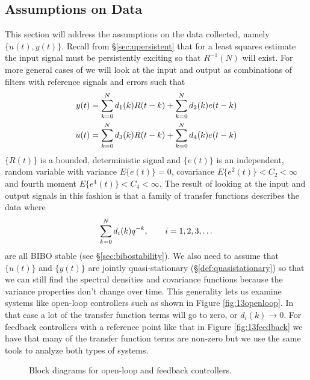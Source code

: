 \subsection{Assumptions on Data}
\label{sec:14data}
This section will address the assumptions on the data collected, namely $\{u(t),y(t)\}$. Recall from \S\ref{sec:upersistent} that for a least squares estimate the input signal must be persistently exciting so that $R^{-1}(N)$ will exist. For more general cases of we will look at the input and output as combinations of filters with reference signals and errors such that
\begin{align*}
y(t) &= \sum_{k=0}^N d_1(k)R(t-k) + \sum_{k=0}^N d_2(k)e(t-k) \\
u(t) &= \sum_{k=0}^N d_3(k)R(t-k) + \sum_{k=0}^N d_4(k)e(t-k)
\end{align*}
$\{R(t)\}$ is a bounded, deterministic signal and $\{e(t)\}$ is an independent, random variable with variance $E\{e(t)\} = 0$, covariance $E\{e^2(t)\}<C_2<\infty$ and fourth moment $E\{e^4(t)\}<C_4<\infty$. The result of looking at the input and output signals in this fashion is that a family of transfer functions describes the data where
$$\sum_{k=0}^N d_i(k)q^{-k}, \qquad i=1,2,3,\ldots$$
are all BIBO stable (see \S\ref{sec:bibostability}). We also need to assume that $\{u(t)\}$ and $\{y(t)\}$ are jointly quasi-stationary (\S\ref{def:quasistationary}) so that we can still find the spectral densities and covariance functions because the variance properties don't change over time. This generality lets us examine systems like open-loop controllers such as shown in Figure \ref{fig:13openloop}. In that case a lot of the transfer function terms will go to zero, or $d_i(k)\to0$. For feedback controllers with a reference point like that in Figure \ref{fig:13feedback} we have that many of the transfer function terms are non-zero but we use the same tools to analyze both types of systems.

\begin{figure}[ht!]
  \centering
   \hfill
   \hfill
  \caption{Block diagrams for open-loop and feedback controllers.}
  \label{fig:13blocks}
\end{figure}

